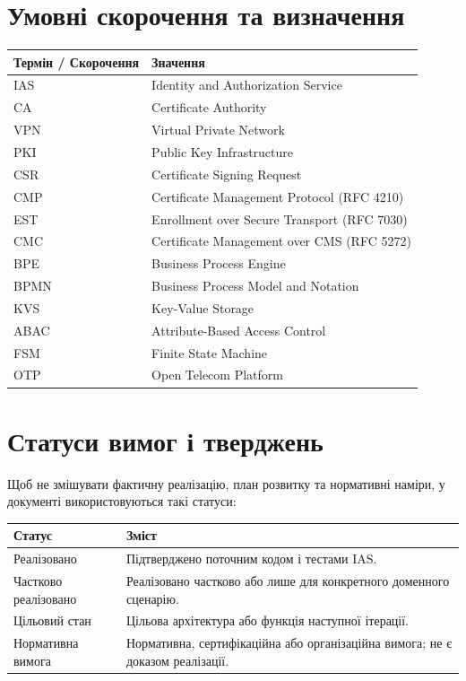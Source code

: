 \documentclass{article}
\begin{document}
\section{Умовні скорочення та визначення}
\begin{longtable}{p{4cm}p{10cm}}
\toprule
\textbf{Термін / Скорочення} & \textbf{Значення} \\
\midrule
IAS & Identity and Authorization Service \\
CA & Certificate Authority \\
VPN & Virtual Private Network \\
PKI & Public Key Infrastructure \\
CSR & Certificate Signing Request \\
CMP & Certificate Management Protocol (RFC 4210) \\
EST & Enrollment over Secure Transport (RFC 7030) \\
CMC & Certificate Management over CMS (RFC 5272) \\
BPE & Business Process Engine \\
BPMN & Business Process Model and Notation \\
KVS & Key-Value Storage \\
ABAC & Attribute-Based Access Control \\
FSM & Finite State Machine \\
OTP & Open Telecom Platform \\
\bottomrule
\end{longtable}

\section{Статуси вимог і тверджень}
Щоб не змішувати фактичну реалізацію, план розвитку та нормативні наміри, у документі використовуються такі статуси:
\begin{longtable}{p{3.2cm}p{10.8cm}}
\toprule
\textbf{Статус} & \textbf{Зміст} \\
\midrule
Реалізовано & Підтверджено поточним кодом і тестами IAS. \\
Частково реалізовано & Реалізовано частково або лише для конкретного доменного сценарію. \\
Цільовий стан & Цільова архітектура або функція наступної ітерації. \\
Нормативна вимога & Нормативна, сертифікаційна або організаційна вимога; не є доказом реалізації. \\
\bottomrule
\end{longtable}
\end{document}
